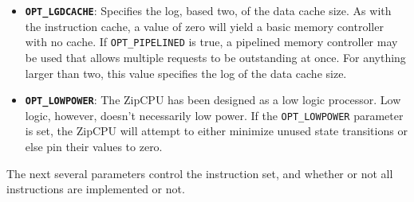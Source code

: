 \documentclass{gqtekspec}
\begin{document}
\begin{itemize}
\item {\bf\tt OPT\_LGDCACHE}: Specifies the log, based two, of the data cache
	size.  As with the instruction cache, a value of zero will yield
	a basic memory controller with no cache.  If {\tt OPT\_PIPELINED} is
	true, a pipelined memory controller may be used that allows multiple
	requests to be outstanding at once.  For anything larger than two,
	this value specifies the log of the data cache size.

\item {\bf\tt OPT\_LOWPOWER}: The ZipCPU has been designed as a low logic
	processor.  Low logic, however, doesn't necessarily low power.  If the
	{\tt OPT\_LOWPOWER} parameter is set, the ZipCPU will attempt to either
	minimize unused state transitions or else pin their values to zero.
\end{itemize}

The next several parameters control the instruction set, and whether or not
all instructions are implemented or not.
\end{document}

